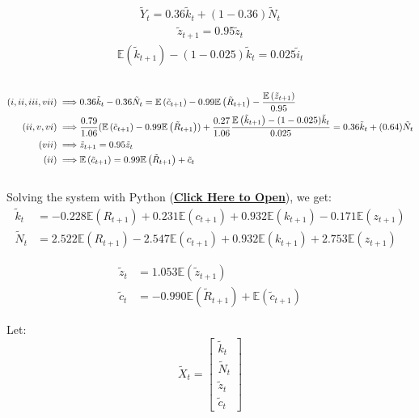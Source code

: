 \documentclass[12pt]{extarticle}
\newcommand{\expec}[1]{\mathbb{E}\left(#1\right)}
\begin{document}
\begin{align}
    \tilde{Y}_t=0.36 \tilde{k}_t + (1-0.36) \tilde{N}_t
\end{align}
\begin{align}
    \tilde{z}_{t+1}=0.95 \tilde{z}_t
\end{align}
\begin{align}
    \expec{\tilde{k}_{t+1}}-(1-0.025)\tilde{k}_t = 0.025 \tilde{i}_t
\end{align}\\
\begin{align*}
    (i,ii,iii,vii) \implies&  0.36 \tilde{k}_t - 0.36 \tilde{N}_t=\expec{\tilde{c}_{t+1}}-0.99\expec{\tilde R_{t+1}}- \dfrac{\expec{\tilde z_{t+1}}}{0.95}\\
    (ii,v,vi) \implies&  \dfrac{0.79}{1.06} (\expec{\tilde{c}_{t+1}}-0.99\expec{\tilde R_{t+1}})+ \dfrac{0.27}{1.06} \dfrac{\expec{\tilde{k}_{t+1}}-(1-0.025)\tilde{k}_t}{0.025} = 0.36 \tilde{k}_t + (0.64) \tilde{N}_t \hfill\\
    (vii) \implies &    \tilde{z}_{t+1}=0.95 \tilde{z}_t\\
    (ii) \implies &     \expec{\tilde{c}_{t+1}}=0.99\expec{\tilde R_{t+1}}+\tilde{c}_t
\end{align*}\\
Solving the system with Python (\textbf{\href{run:System Solver.ipynb}{Click Here to Open}}), we get:
\begin{align}
    \tilde k_t &= -0.228\expec{R_{t+1}} + 0.231\expec{c_{t+1}} + 0.932\expec{k_{t+1}} - 0.171\expec{z_{t+1}}\\
    \tilde N_t &= 2.522\expec{R_{t+1}} - 2.547\expec{c_{t+1}} + 0.932\expec{k_{t+1}} + 2.753\expec{z_{t+1}}
\end{align}

\begin{align}
    \tilde{z}_t&=1.053\expec{\tilde{z}_{t+1}}\\
    \tilde{c}_t&=-0.990\expec{\tilde R_{t+1}}+\expec{\tilde{c}_{t+1}}
\end{align}

\newpage


Let:
$$\tilde{X}_t = \begin{bmatrix} \tilde{k}_t \\ \tilde{N}_t \\ \tilde{z}_t \\ \tilde{c}_t \end{bmatrix}$$
\end{document}
